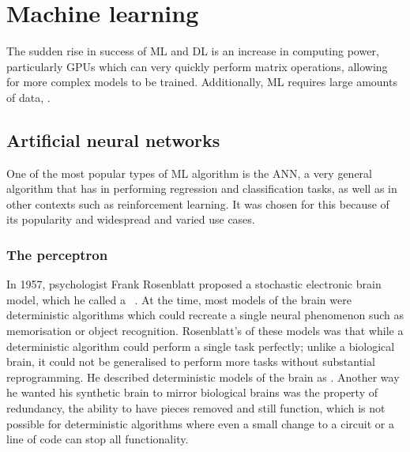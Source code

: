 
\chapter{Machine learning}

The sudden rise in success of \ac{ML} and \ac{DL} is  an increase in computing power, particularly \acp{GPU} which can very quickly perform matrix operations, allowing for more complex models to be trained.
Additionally, \ac{ML} requires large amounts of data, .

\section{Artificial neural networks}

One of the most popular types of \ac{ML} algorithm is the \acl{ANN}, a very general algorithm that has  in performing regression and classification tasks, as well as in other contexts such as reinforcement learning.
It was chosen for this   because of its popularity and widespread and varied use cases.

\subsection{The perceptron}

In 1957, psychologist Frank Rosenblatt proposed a stochastic electronic brain model, which he called a ~\autocite{rosenblatt1957}.
At the time, most models of the brain were deterministic algorithms which could recreate a single neural phenomenon such as memorisation or object recognition.
Rosenblatt's  of these models was that while a deterministic algorithm could perform a single task perfectly; unlike a biological brain, it could not be generalised to perform more tasks without substantial reprogramming.
He described deterministic models of the brain as .
Another way he wanted his synthetic brain to mirror biological brains was the property of redundancy, the ability to have pieces removed and still function, which is not possible for deterministic algorithms where even a small change to a circuit or a line of code can stop all functionality.

